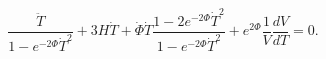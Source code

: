 \begin{equation} \label{einstein4}
\frac{\ddot T}{1-e^{-2\Phi}\dot T^2}
+3H\dot T 
+\dot\Phi\dot T \frac{1-2e^{-2\Phi}\dot T^2}{1-e^{-2\Phi}\dot T^2}
+e^{2\Phi}\frac{1}{V}\frac{dV}{dT}=0.
\end{equation}

